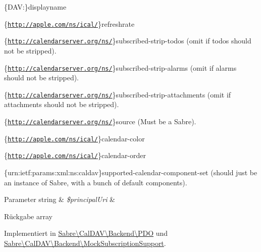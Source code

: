 \begin{DoxyEnumerate}
\item \{D\+AV\+:\}displayname
\item \{\href{http://apple.com/ns/ical/}{\tt http\+://apple.\+com/ns/ical/}\}refreshrate
\item \{\href{http://calendarserver.org/ns/}{\tt http\+://calendarserver.\+org/ns/}\}subscribed-\/strip-\/todos (omit if todos should not be stripped).
\item \{\href{http://calendarserver.org/ns/}{\tt http\+://calendarserver.\+org/ns/}\}subscribed-\/strip-\/alarms (omit if alarms should not be stripped).
\item \{\href{http://calendarserver.org/ns/}{\tt http\+://calendarserver.\+org/ns/}\}subscribed-\/strip-\/attachments (omit if attachments should not be stripped).
\item \{\href{http://calendarserver.org/ns/}{\tt http\+://calendarserver.\+org/ns/}\}source (Must be a Sabre).
\item \{\href{http://apple.com/ns/ical/}{\tt http\+://apple.\+com/ns/ical/}\}calendar-\/color
\item \{\href{http://apple.com/ns/ical/}{\tt http\+://apple.\+com/ns/ical/}\}calendar-\/order
\item \{urn\+:ietf\+:params\+:xml\+:ns\+:caldav\}supported-\/calendar-\/component-\/set (should just be an instance of Sabre, with a bunch of default components).
\end{DoxyEnumerate}


\begin{DoxyParams}[1]{Parameter}
string & {\em \$principal\+Uri} & \\
\hline
\end{DoxyParams}
\begin{DoxyReturn}{Rückgabe}
array 
\end{DoxyReturn}


Implementiert in \mbox{\hyperlink{class_sabre_1_1_cal_d_a_v_1_1_backend_1_1_p_d_o_a5bf32ef934dfe8d5fa3aff7a8fa918af}{Sabre\textbackslash{}\+Cal\+D\+A\+V\textbackslash{}\+Backend\textbackslash{}\+P\+DO}} und \mbox{\hyperlink{class_sabre_1_1_cal_d_a_v_1_1_backend_1_1_mock_subscription_support_a6586395148ea71f7d9bf101f8b9ee517}{Sabre\textbackslash{}\+Cal\+D\+A\+V\textbackslash{}\+Backend\textbackslash{}\+Mock\+Subscription\+Support}}.

\mbox{\label{interface_sabre_1_1_cal_d_a_v_1_1_backend_1_1_subscription_support_a20f5a3472fb23eca7bde970c959dee66}} 
